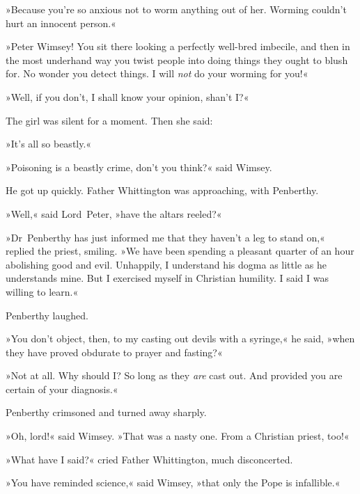 »Because you're so anxious not to worm anything out of her. Worming couldn't hurt an innocent person.«

»Peter Wimsey! You sit there looking a perfectly well-bred imbecile, and then in the most underhand way you twist people into doing things they ought to blush for. No wonder you detect things. I will \textit{not} do your worming for you!«

»Well, if you don't, I shall know your opinion, shan't I\@?«

The girl was silent for a moment. Then she said:

»It's all so beastly.«

»Poisoning is a beastly crime, don't you think?« said Wimsey.

He got up quickly. Father Whittington was approaching, with Penberthy.

»Well,« said Lord~Peter, »have the altars reeled?«

»Dr~Penberthy has just informed me that they haven't a leg to stand on,« replied the priest, smiling. »We have been spending a pleasant quarter of an hour abolishing good and evil. Unhappily, I understand his dogma as little as he understands mine. But I exercised myself in Christian humility. I said I was willing to learn.«

Penberthy laughed.

»You don't object, then, to my casting out devils with a syringe,« he said, »when they have proved obdurate to prayer and fasting?«

»Not at all. Why should I\@? So long as they \textit{are} cast out. And provided you are certain of your diagnosis.«

Penberthy crimsoned and turned away sharply.

»Oh, lord!« said Wimsey. »That was a nasty one. From a Christian priest, too!«

»What have I said?« cried Father Whittington, much disconcerted.

»You have reminded science,« said Wimsey, »that only the Pope is infallible.«